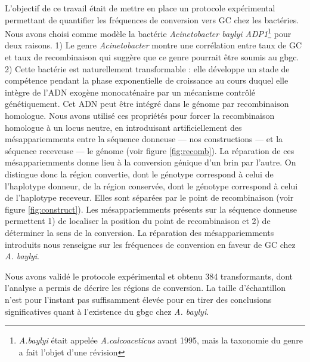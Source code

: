 L'objectif de ce travail était de mettre en place un protocole expérimental
permettant de quantifier les fréquences de conversion vers GC chez les
bactéries. Nous avons choisi comme modèle la bactérie \emph{Acinetobacter baylyi
  ADP1}\footnote{\emph{A.baylyi} était appelée \emph{A.calcoaceticus} avant
  1995, mais la taxonomie du genre a fait l'objet d'une
  révision\cite{euzeby_list_1997}} pour deux raisons. 1) Le genre
\emph{Acinetobacter} montre une corrélation entre taux de GC et taux de
recombinaison\cite{lassalle_gc-content_2015} qui suggère que ce genre pourrait
être soumis au \ac{gbgc}. 2) Cette bactérie est naturellement transformable :
elle développe un stade de compétence pendant la phase exponentielle de
croissance au cours duquel elle intègre de l'ADN exogène
monocaténaire par un mécanisme contrôlé génétiquement\cite{chen_dna_2004}. Cet
ADN peut être intégré dans le génome par recombinaison homologue. Nous avons
utilisé ces propriétés pour forcer la recombinaison homologue à un locus neutre,
en introduisant artificiellement des mésappariemments entre la séquence donneuse
--- nos constructions --- et la séquence receveuse --- le génome (voir figure
\ref{fig:recomb}). La réparation de ces mésappariemments donne lieu à la
conversion génique d'un brin par l'autre. On distingue donc la région convertie,
dont le génotype correspond à celui de l'haplotype donneur, de la région
conservée, dont le génotype correspond à celui de l'haplotype receveur. Elles
sont séparées par le point de recombinaison (voir figure \ref{fig:construct}).
Les mésappariemments présents sur la séquence donneuse permettent 1) de
localiser la position du point de recombinaison et 2) de déterminer la sens de
la conversion. La réparation des mésappariemments introduits nous renseigne sur
les fréquences de conversion en faveur de GC chez \emph{A. baylyi}.

Nous avons validé le protocole expérimental et obtenu \num{384} transformants,
dont l'analyse a permis de décrire les régions de conversion. La taille
d'échantillon n'est pour l'instant pas suffisamment élevée pour en tirer des
conclusions significatives quant à l'existence du \ac{gbgc} chez \emph{A.
  baylyi}.

\newpage